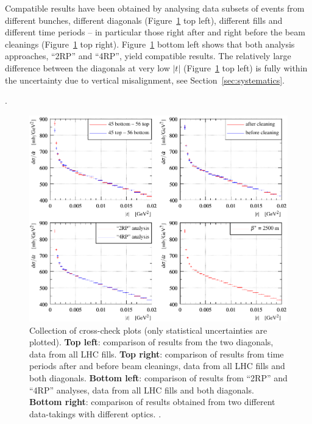 Compatible results have been obtained by analysing data subsets of events from different bunches, different diagonals (Figure~\ref{fig:dsdt checks} top left), different fills and different time periods -- in particular those right after and right before the beam cleanings (Figure~\ref{fig:dsdt checks} top right). Figure~\ref{fig:dsdt checks} bottom left shows that both analysis approaches, ``2RP'' and ``4RP'', yield compatible results. The relatively large difference between the diagonals at very low $|t|$ (Figure~\ref{fig:dsdt checks} top left) is fully within the uncertainty due to vertical misalignment, see Section~\ref{sec:systematics}.

.

\begin{figure}
\vskip-5mm
\begin{center}
\includegraphics{fig/t_dist_cross_checks.pdf}
\caption{%
Collection of cross-check plots (only statistical uncertainties are plotted).
{\bf Top left}: comparison of results from the two diagonals, data from all LHC fills.
{\bf Top right}: comparison of results from time periods after and before beam cleanings, data from all LHC fills and both diagonals.
{\bf Bottom left}: comparison of results from ``2RP'' and ``4RP'' analyses, data from all LHC fills and both diagonals.
{\bf Bottom right}: comparison of results obtained from two different data-takings with different optics. .
}
\label{fig:dsdt checks}
\end{center}
\end{figure}



